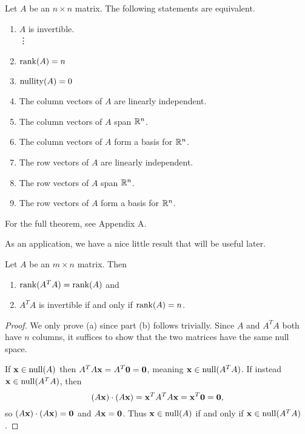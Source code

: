 \documentclass[../m073main.tex]{subfiles}
\begin{document}
\begin{theorem}
	Let $A$ be an $n\times n$ matrix.
	The following statements are equivalent.
	\begin{multicols}{2}
		\begin{enumerate}[label=(\alph*)]
			\item $A$ is invertible. \\
			\phantom{~}\hspace{-19.5pt} \vdots
			\setcounter{enumi}{5}		
			\item $\operatorname{rank}(A) = n$
			\item $\operatorname{nullity}(A) = 0$
			\item The column vectors of $A$ are linearly independent.
			\item The column vectors of $A$ span $\mathbb{R}^n$.
			\item The column vectors of $A$ form a basis for $\mathbb{R}^n$.
			\item The row vectors of $A$ are linearly independent.
			\item The row vectors of $A$ span $\mathbb{R}^n$.
			\item The row vectors of $A$ form a basis for $\mathbb{R}^n$.
		\end{enumerate}
	\end{multicols}
	For the full theorem, see Appendix A.
\end{theorem}

As an application, we have a nice little result that will be useful later.

\begin{theorem}
	Let $A$ be an $m\times n$ matrix.
	Then
	\begin{enumerate}[label=(\alph*)]
		\item $\operatorname{rank}(A^TA) = \operatorname{rank}(A)$ and
		\item $A^TA$ is invertible if and only if $\operatorname{rank}(A) = n$.
	\end{enumerate}
\end{theorem}

\begin{proof}
	We only prove (a) since part (b) follows trivially.
	Since $A$ and $A^TA$ both have $n$ columns, it suffices to show that the two matrices have the same null space.

	If $\mathbf{x} \in \operatorname{null}(A)$ then $A^T A \mathbf{x} = A^T \mathbf{0} = \mathbf{0}$, meaning $\mathbf{x} \in \operatorname{null} (A^TA)$.
	If instead $\mathbf{x} \in \operatorname{null} (A^T A)$, then
	\[ (A \mathbf{x}) \cdot (A \mathbf{x}) = \mathbf{x}^T A^T A \mathbf{x} = \mathbf{x}^T \mathbf{0} = \mathbf{0}, \]
	so $(A \mathbf{x}) \cdot (A \mathbf{x}) = \mathbf{0}$ and $A \mathbf{x} = \mathbf{0}$.
	Thus $\mathbf{x} \in \operatorname{null}(A)$ if and only if $\mathbf{x} \in \operatorname{null}(A^T A)$.
\end{proof}
\end{document}
